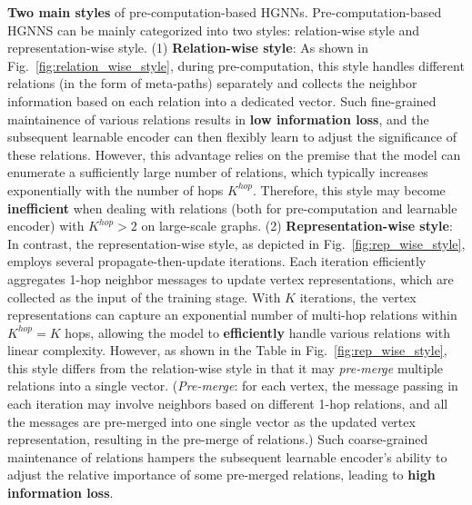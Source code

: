 \documentclass[lettersize,journal]{IEEEtran}
\begin{document}
\textbf{Two main styles} of pre-computation-based HGNNs.
Pre-computation-based HGNNS can be mainly categorized into two styles: relation-wise style and representation-wise style.
(1) \textbf{Relation-wise style}: As shown in Fig.~\ref{fig:relation_wise_style}, during pre-computation, this style handles different relations (in the form of meta-paths) separately and collects the neighbor information based on each relation into a dedicated vector.
Such fine-grained maintainence of various relations results in \textbf{low information loss}, and the subsequent learnable encoder can then flexibly learn to adjust the significance of these relations.
However, this advantage relies on the premise that the model can enumerate a sufficiently large number of relations, which typically increases exponentially with the number of hops $K^{hop}$. 
Therefore, this style may become \textbf{inefficient} when dealing with relations (both for pre-computation and learnable encoder) with $K^{hop} > 2$ on large-scale graphs.
(2) \textbf{Representation-wise style}: In contrast, the representation-wise style, as depicted in Fig.~\ref{fig:rep_wise_style}, employs several propagate-then-update iterations. 
Each iteration efficiently aggregates 1-hop neighbor messages to update vertex representations, which are collected as the input of the training stage. 
With $K$ iterations, the vertex representations can capture an exponential number of multi-hop relations within $K^{hop}=K$ hops, allowing the model to \textbf{efficiently} handle various relations with linear complexity.
However, as shown in the Table in Fig.~\ref{fig:rep_wise_style}, this style differs from the relation-wise style in that it may \textit{pre-merge} multiple relations into a single vector.
(\textit{Pre-merge}: for each vertex, the message passing in each iteration may involve neighbors based on different 1-hop relations, and all the messages are pre-merged into one single vector as the updated vertex representation, resulting in the pre-merge of relations.)
Such coarse-grained maintenance of relations hampers the subsequent learnable encoder's ability to adjust the relative importance of some pre-merged relations, leading to \textbf{high information loss}.
\end{document}
